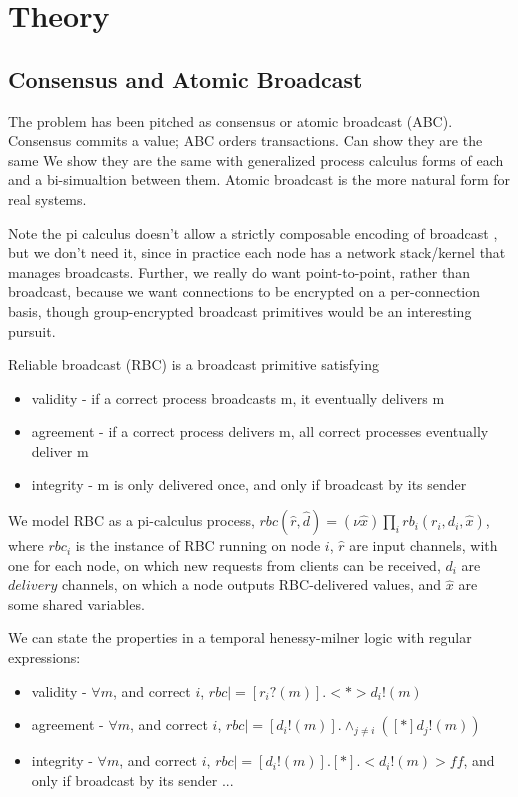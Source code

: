 \chapter{Theory}

\section{Consensus and Atomic Broadcast}
The problem has been pitched as consensus or atomic broadcast (ABC).
Consensus commits a value; ABC orders transactions.
Can show they are the same \cite{chandra1996unreliable}
We show they are the same with generalized process calculus forms of each and a bi-simualtion between them.
Atomic broadcast is the more natural form for real systems.

Note the pi calculus doesn't allow a strictly composable encoding of broadcast \cite{ene1999expressiveness},
but we don't need it, since in practice each node has a network stack/kernel that manages broadcasts.
Further, we really do want point-to-point, rather than broadcast,
because we want connections to be encrypted on a per-connection basis,
though group-encrypted broadcast primitives would be an interesting pursuit.

Reliable broadcast (RBC) is a broadcast primitive satisfying

\begin{itemize}
\item validity - if a correct process broadcasts m, it eventually delivers m
\item agreement - if a correct process delivers m, all correct processes eventually deliver m
\item integrity - m is only delivered once, and only if broadcast by its sender
\end{itemize}

We model RBC as a pi-calculus process, 
$rbc(\hat{r}, \hat{d}) = (\nu \hat{x}) \prod_i rb_i(r_i, d_i, \hat{x})$,
where $rbc_i$ is the instance of RBC running on node $i$, 
$\hat{r}$ are input channels, with one for each node, 
on which new requests from clients can be received, 
$d_i$ are $delivery$ channels, on which a node outputs RBC-delivered values,
and $\hat{x}$ are some shared variables.

We can state the properties in a temporal henessy-milner logic with regular expressions: %
\begin{itemize}
\item validity - $ \forall m$, and correct $i$, $rbc |= [ r_i?(m) ] . < * > d_i!(m) $
\item agreement - $ \forall m$, and correct $i$, $rbc |= [ d_i!(m) ] . \wedge_{j \neq i} ( [ * ] d_j!(m) )$
\item integrity - $ \forall m$, and correct $i$, $rbc |= [ d_i!(m) ] . [ * ] . < d_i!(m) > ff $, and only if broadcast by its sender ...
\end{itemize}


